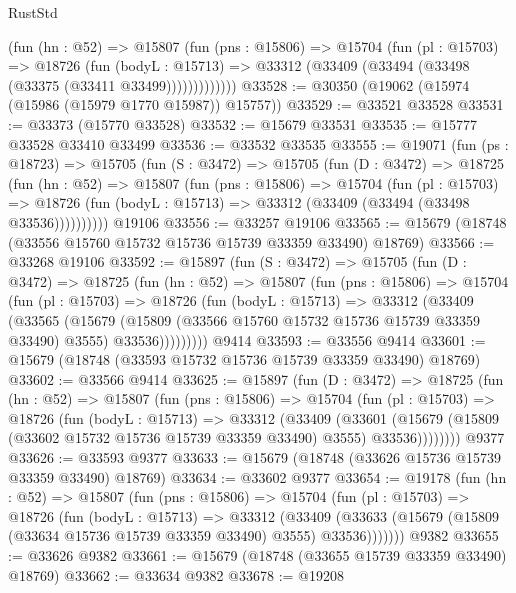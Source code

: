 \begin{lexlean}{RustStd}
\begin{coremodule}
            (fun (hn : @52) =>
            @15807
              (fun (pns : @15806) =>
              @15704
                (fun (pl : @15703) =>
                @18726
                  (fun (bodyL : @15713) =>
                  @33312 (@33409 (@33494 (@33498 (@33375 (@33411 @33499)))))))))))))
@33528 := @30350 (@19062 (@15974 (@15986 (@15979 @1770 @15987)) @15757))
@33529 := @33521 @33528
@33531 := @33373 (@15770 @33528)
@33532 := @15679 @33531
@33535 := @15777 @33528 @33410 @33499
@33536 := @33532 @33535
@33555 := @19071
    (fun (ps : @18723) =>
    @15705
      (fun (S : @3472) =>
      @15705
        (fun (D : @3472) =>
        @18725
          (fun (hn : @52) =>
          @15807
            (fun (pns : @15806) =>
            @15704
              (fun (pl : @15703) =>
              @18726 (fun (bodyL : @15713) => @33312 (@33409 (@33494 (@33498 @33536))))))))))
    @19106
@33556 := @33257 @19106
@33565 := @15679 (@18748 (@33556 @15760 @15732 @15736 @15739 @33359 @33490) @18769)
@33566 := @33268 @19106
@33592 := @15897
    (fun (S : @3472) =>
    @15705
      (fun (D : @3472) =>
      @18725
        (fun (hn : @52) =>
        @15807
          (fun (pns : @15806) =>
          @15704
            (fun (pl : @15703) =>
            @18726
              (fun (bodyL : @15713) =>
              @33312
                (@33409
                  (@33565
                    (@15679
                      (@15809 (@33566 @15760 @15732 @15736 @15739 @33359 @33490) @3555)
                      @33536)))))))))
    @9414
@33593 := @33556 @9414
@33601 := @15679 (@18748 (@33593 @15732 @15736 @15739 @33359 @33490) @18769)
@33602 := @33566 @9414
@33625 := @15897
    (fun (D : @3472) =>
    @18725
      (fun (hn : @52) =>
      @15807
        (fun (pns : @15806) =>
        @15704
          (fun (pl : @15703) =>
          @18726
            (fun (bodyL : @15713) =>
            @33312
              (@33409
                (@33601
                  (@15679 (@15809 (@33602 @15732 @15736 @15739 @33359 @33490) @3555) @33536))))))))
    @9377
@33626 := @33593 @9377
@33633 := @15679 (@18748 (@33626 @15736 @15739 @33359 @33490) @18769)
@33634 := @33602 @9377
@33654 := @19178
    (fun (hn : @52) =>
    @15807
      (fun (pns : @15806) =>
      @15704
        (fun (pl : @15703) =>
        @18726
          (fun (bodyL : @15713) =>
          @33312
            (@33409
              (@33633 (@15679 (@15809 (@33634 @15736 @15739 @33359 @33490) @3555) @33536)))))))
    @9382
@33655 := @33626 @9382
@33661 := @15679 (@18748 (@33655 @15739 @33359 @33490) @18769)
@33662 := @33634 @9382
@33678 := @19208

\end{coremodule}
\end{lexlean}
